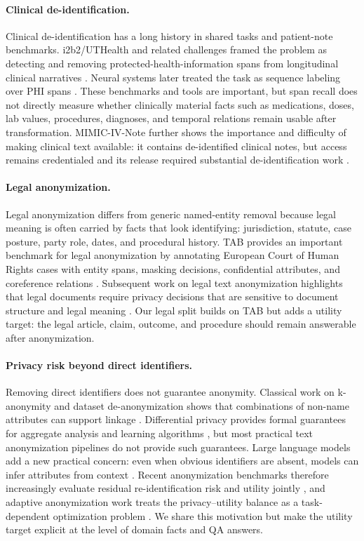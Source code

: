 \documentclass{article}
\begin{document}
\paragraph{Clinical de-identification.}
Clinical de-identification has a long history in shared tasks and patient-note
benchmarks.  i2b2/UTHealth and related challenges framed the problem as detecting
and removing protected-health-information spans from longitudinal clinical
narratives \cite{stubbs2015automated}.  Neural systems later treated the task as
sequence labeling over PHI spans \cite{dernoncourt2016patientnotes}.  These
benchmarks and tools are important, but span recall does not directly measure
whether clinically material facts such as medications, doses, lab values,
procedures, diagnoses, and temporal relations remain usable after transformation.
MIMIC-IV-Note further shows the importance and difficulty of making clinical text
available: it contains de-identified clinical notes, but access remains
credentialed and its release required substantial de-identification work
\cite{johnson2023mimicnote}.

\paragraph{Legal anonymization.}
Legal anonymization differs from generic named-entity removal because legal
meaning is often carried by facts that look identifying: jurisdiction, statute,
case posture, party role, dates, and procedural history.  TAB provides an
important benchmark for legal anonymization by annotating European Court of Human
Rights cases with entity spans, masking decisions, confidential attributes, and
coreference relations \cite{pilan2022tab}.  Subsequent work on legal text
anonymization highlights that legal documents require privacy decisions that are
sensitive to document structure and legal meaning \cite{papadopoulou2023neural}.
Our legal split builds on TAB but adds a utility target: the legal article,
claim, outcome, and procedure should remain answerable after anonymization.

\paragraph{Privacy risk beyond direct identifiers.}
Removing direct identifiers does not guarantee anonymity.  Classical work on
k-anonymity and dataset de-anonymization shows that combinations of non-name
attributes can support linkage \cite{sweeney2002kanonymity,narayanan2008robust}.
Differential privacy provides formal guarantees for aggregate analysis and
learning algorithms \cite{dwork2006calibrating}, but most practical text
anonymization pipelines do not provide such guarantees.  Large language models
add a new practical concern: even when obvious identifiers are absent, models can
infer attributes from context \cite{staab2023beyond}.  Recent anonymization
benchmarks therefore increasingly evaluate residual re-identification risk and
utility jointly \cite{loiseau2025taueval,krco2026ratbench}, and adaptive
anonymization work treats the privacy--utility balance as a task-dependent
optimization problem \cite{loiseau2026adaptive}.  We share this motivation but
make the utility target explicit at the level of domain facts and QA answers.
\end{document}
